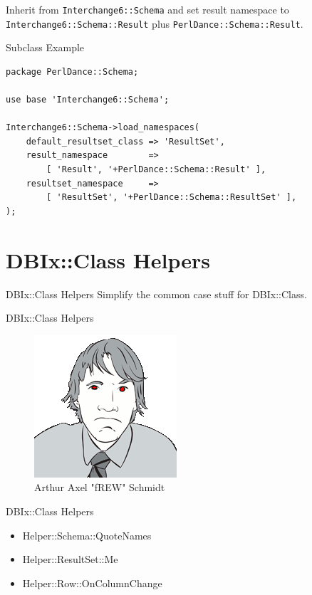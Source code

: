 Inherit from \verb|Interchange6::Schema| and set result namespace to 
\verb|Interchange6::Schema::Result| plus \verb|PerlDance::Schema::Result|.

\begin{frame}[fragile]{Subclass Example}
\begin{lstlisting}
package PerlDance::Schema;

use base 'Interchange6::Schema';

Interchange6::Schema->load_namespaces(
    default_resultset_class => 'ResultSet',
    result_namespace        =>
        [ 'Result', '+PerlDance::Schema::Result' ],
    resultset_namespace     =>
        [ 'ResultSet', '+PerlDance::Schema::ResultSet' ],
);
\end{lstlisting}
\end{frame}



\section{DBIx::Class Helpers}

\begin{frame}{DBIx::Class Helpers}
Simplify the common case stuff for DBIx::Class.
\end{frame}

\begin{frame}{DBIx::Class Helpers}
\begin{figure}[!ht]
\centering
\includegraphics[width=0.4\linewidth]{img/frew.png}
\caption{Arthur Axel "fREW" Schmidt}
\end{figure}
\end{frame}


\begin{frame}{DBIx::Class Helpers}
\begin{itemize}
\item Helper::Schema::QuoteNames
\item Helper::ResultSet::Me
\item Helper::Row::OnColumnChange
\end{itemize}
\end{frame}

